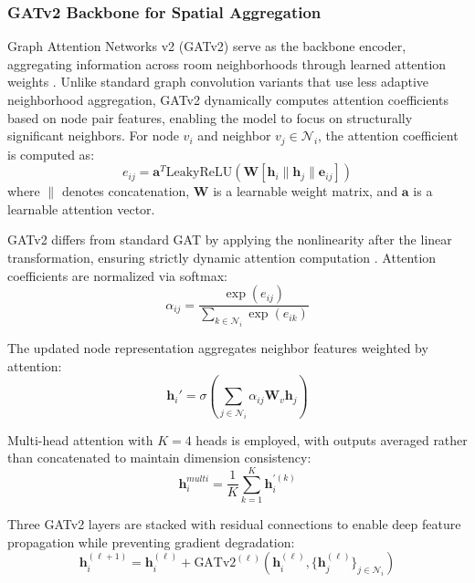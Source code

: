 \subsubsection{GATv2 Backbone for Spatial Aggregation}

Graph Attention Networks v2 (GATv2) serve as the backbone encoder, aggregating information across room neighborhoods through learned attention weights \cite{velickovicGraphAttentionNetworks2018,brodyHowAttentiveAre2022}.
Unlike standard graph convolution variants that use less adaptive neighborhood aggregation, GATv2 dynamically computes attention coefficients based on node pair features, enabling the model to focus on structurally significant neighbors. For node $v_i$ and neighbor $v_j \in \mathcal{N}_i$, the attention coefficient is computed as:
\begin{equation}
e_{ij} = \mathbf{a}^T \text{LeakyReLU}\left(\mathbf{W} [\mathbf{h}_i \| \mathbf{h}_j \| \mathbf{e}_{ij}]\right)
\label{eq:method_gat_attn_logit}
\end{equation}
where $\|$ denotes concatenation, $\mathbf{W}$ is a learnable weight matrix, and $\mathbf{a}$ is a learnable attention vector.

GATv2 differs from standard GAT by applying the nonlinearity after the linear transformation, ensuring strictly dynamic attention computation \cite{brodyHowAttentiveAre2022}. Attention coefficients are normalized via softmax:
\begin{equation}
\alpha_{ij} = \frac{\exp(e_{ij})}{\sum_{k \in \mathcal{N}_i} \exp(e_{ik})}
\label{eq:method_gat_attn_softmax}
\end{equation}

The updated node representation aggregates neighbor features weighted by attention:
\begin{equation}
\mathbf{h}_i' = \sigma\left(\sum_{j \in \mathcal{N}_i} \alpha_{ij} \mathbf{W}_v \mathbf{h}_j\right)
\label{eq:method_gat_update}
\end{equation}

Multi-head attention with $K=4$ heads is employed, with outputs averaged rather than concatenated to maintain dimension consistency:
\begin{equation}
\mathbf{h}_i^{multi} = \frac{1}{K}\sum_{k=1}^{K} \mathbf{h}_i^{'(k)}
\label{eq:method_multihead_avg}
\end{equation}

Three GATv2 layers are stacked with residual connections to enable deep feature propagation while preventing gradient degradation:
\begin{equation}
\mathbf{h}_i^{(\ell+1)} = \mathbf{h}_i^{(\ell)} + \text{GATv2}^{(\ell)}(\mathbf{h}_i^{(\ell)}, \{\mathbf{h}_j^{(\ell)}\}_{j \in \mathcal{N}_i})
\label{eq:method_residual_gat}
\end{equation}


